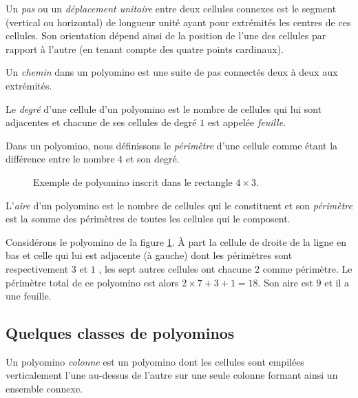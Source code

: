  Un \emph{pas} ou un \emph{déplacement unitaire} entre deux cellules connexes est le segment (vertical ou horizontal) de longueur unité ayant pour extrémités les centres de ces cellules. Son orientation dépend ainsi de la position de l'une des cellules par rapport à l'autre (en tenant compte des quatre points cardinaux).
 
 Un \emph{chemin} dans un polyomino est une suite de pas connectés deux à deux aux extrémités.

Le \emph{degré} d'une  cellule d'un  polyomino  est le nombre de cellules qui lui sont adjacentes et chacune de ses cellules de degré $1$   est appelée \emph{feuille}. 

 Dans un polyomino, nous définissons le \emph{périmètre} d'une cellule comme  étant la différence entre le nombre $4$ et son degré.
 
 
 \begin{figure}[!htb]
\begin{minipage}[c]{.17\linewidth}
\centering

\end{minipage}\hfill
\begin{minipage}[c]{.56\linewidth}
        \centering
\begin{logicpuzzle}[rows=3,columns=4,color=cyan!100, width=750px,scale=0.5]
\framepuzzle[black!50]
\end{logicpuzzle}
\end{minipage}
\caption{\label{figper}Exemple de polyomino inscrit dans le rectangle $4\times 3$. }
\end{figure}

  L'\emph{aire} d'un polyomino est le nombre de cellules qui le constituent 
et  son \emph{périmètre} est la somme des périmètres  de toutes les cellules qui le composent.
\begin{Ex}\label{ex1}
 Considérons le  polyomino de la figure \ref{figper}. À part la cellule de droite de la ligne en bas et celle qui lui est adjacente (à gauche) dont les périmètres sont respectivement  $3$ et $1$ , les sept autres cellules ont chacune $2$ comme périmètre. Le périmètre total de ce polyomino est alors $2\times 7 +3+1=18$. Son  aire est $9$ et il  a une feuille.
\end{Ex} 
\begin{spacing}{0.30}
\subsection{Quelques classes de polyominos}
\end{spacing}
 Un polyomino  \emph{colonne} est un polyomino dont les cellules sont empilées verticalement l'une au-dessus de l'autre sur une seule colonne formant ainsi un ensemble connexe.


